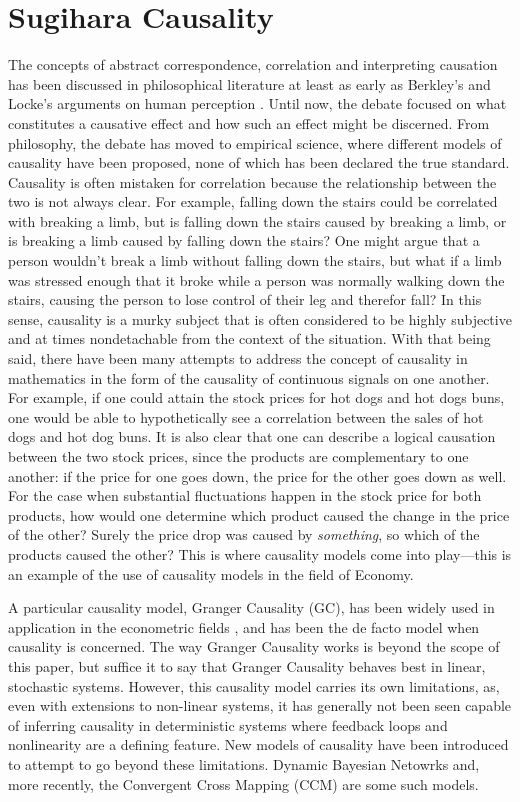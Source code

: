 \section{Sugihara Causality}
The concepts of abstract correspondence, correlation and interpreting causation has been discussed in philosophical literature at least as early as Berkley's and Locke's arguments on human perception \cite{Locke1841} \cite{Berkeley1874}. Until now, the debate focused on what constitutes a causative effect and how such an effect might be discerned. From philosophy, the debate has moved to empirical science, where different models of causality have been proposed, none of which has been declared the true standard. Causality is often mistaken for correlation because the relationship between the two is not always clear. For example, falling down the stairs could be correlated with breaking a limb, but is falling down the stairs caused by breaking a limb, or is breaking a limb caused by falling down the stairs? One might argue that a person wouldn't break a limb without falling down the stairs, but what if a limb was stressed enough that it broke while a person was normally walking down the stairs, causing the person to lose control of their leg and therefor fall? In this sense, causality is a murky subject that is often considered to be highly subjective and at times nondetachable from the context of the situation. With that being said, there have been many attempts to address the concept of causality in mathematics in the form of the causality of continuous signals on one another. For example, if one could attain the stock prices for hot dogs and hot dogs buns, one would be able to hypothetically see a correlation between the sales of hot dogs and hot dog buns. It is also clear that one can describe a logical causation between the two stock prices, since the products are complementary to one another: if the price for one goes down, the price for the other goes down as well. For the case when substantial fluctuations happen in the stock price for both products, how would one determine which product caused the change in the price of the other? Surely the price drop was caused by \textit{something}, so which of the products caused the other? This is where causality models come into play---this is an example of the use of causality models in the field of Economy.

A particular causality model, Granger Causality (GC), has been widely used in application in the econometric fields \cite{Granger1969}, and has been the de facto model when causality is concerned. The way Granger Causality works is beyond the scope of this paper, but suffice it to say that Granger Causality behaves best in linear, stochastic systems. However, this causality model carries its own limitations, as, even with extensions to non-linear systems, it has generally not been seen capable of inferring causality in deterministic systems where feedback loops and nonlinearity are a defining feature. New models of causality have been introduced to attempt to go beyond these limitations. Dynamic Bayesian Netowrks and, more recently, the Convergent Cross Mapping (CCM) are some such models. 

